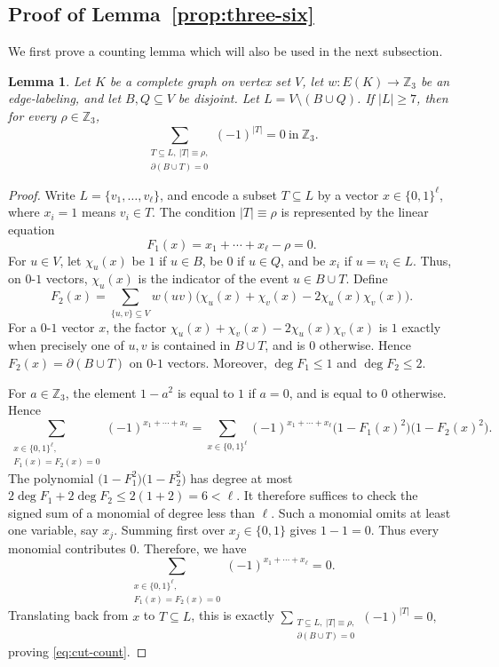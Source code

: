 ﻿\documentclass[11pt]{article}
\numberwithin{equation}{section}
\newtheorem{lemma}[theorem]{Lemma}
\theoremstyle{remark}
\newcommand{\Z}{\mathbb Z}
\begin{document}
\subsection{Proof of Lemma~\ref{prop:three-six}}\label{subsec:prop36}

We first prove a counting lemma which will also be used in the next subsection.

\begin{lemma}\label{lem:cut-count}
    Let $K$ be a complete graph on vertex set $V$, let $w\colon E(K)\to\Z_3$ be an edge-labeling, and let $B,Q\subseteq V$ be disjoint.  Let $L=V\setminus(B\cup Q)$.  If $|L|\ge7$, then for every $\rho\in\Z_3$,
    \begin{equation}\label{eq:cut-count}
        \sum_{\substack{T\subseteq L,\ |T|\equiv\rho,\\ \partial(B\cup T)=0}}(-1)^{|T|}=0\ \text{in}\ \Z_3.
    \end{equation}
\end{lemma}

\begin{proof}
    Write $L=\{v_1,\ldots,v_\ell\}$, and encode a subset $T\subseteq L$ by a vector $x\in\{0,1\}^\ell$, where $x_i=1$ means $v_i\in T$.  The condition $|T|\equiv\rho$ is represented by the linear equation
    \[
        F_1(x)=x_1+\cdots+x_\ell-\rho=0.
    \]
    For \(u\in V\), let $\chi_u(x)$ be $1$ if $u\in B$, be $0$ if $u\in Q$, and be $x_i$ if $u=v_i\in L$.  Thus, on \(0\)-\(1\) vectors, \(\chi_u(x)\) is the indicator of the event \(u\in B\cup T\). Define
    \[
        F_2(x)=\sum_{\{u,v\}\subseteq V}w(uv)\bigl(\chi_u(x)+\chi_v(x)-2\chi_u(x)\chi_v(x)\bigr).
    \]
    For a \(0\)-\(1\) vector \(x\), the factor
    \(\chi_u(x)+\chi_v(x)-2\chi_u(x)\chi_v(x)\)
    is \(1\) exactly when precisely one of \(u,v\) is contained in \(B\cup T\), and is \(0\) otherwise. Hence
    \(F_2(x)=\partial(B\cup T)\)
    on \(0\)-\(1\) vectors. Moreover, \(\deg F_1\le 1\) and \(\deg F_2\le 2\).

    For \(a\in \Z_3\), the element \(1-a^2\) is equal to \(1\) if \(a=0\), and is equal to \(0\) otherwise. Hence
    \[
        \sum_{\substack{x\in\{0,1\}^\ell,\\ F_1(x)=F_2(x)=0}}
        (-1)^{x_1+\cdots+x_\ell}
        =
        \sum_{x\in\{0,1\}^\ell}
        (-1)^{x_1+\cdots+x_\ell}
        \bigl(1-F_1(x)^2\bigr)\bigl(1-F_2(x)^2\bigr).
    \]
    The polynomial
    \(\bigl(1-F_1^2\bigr)\bigl(1-F_2^2\bigr)\)
    has degree at most \(2\deg F_1+2\deg F_2\le 2(1+2)=6<\ell\). It therefore suffices to check the signed sum of a monomial of degree less than \(\ell\). Such a monomial omits at least one variable, say \(x_j\). Summing first over \(x_j\in\{0,1\}\) gives
    \(1-1=0.\)
    Thus every monomial contributes \(0\). Therefore, we have
    \[
        \sum_{\substack{x\in\{0,1\}^\ell,\\ F_1(x)=F_2(x)=0}}
        (-1)^{x_1+\cdots+x_\ell}=0.
    \]
    Translating back from \(x\) to \(T\subseteq L\), this is exactly
    \(
    \sum_{\substack{T\subseteq L,\ |T|\equiv \rho,\\ \partial(B\cup T)=0}}
    (-1)^{|T|}=0,
    \)
    proving \eqref{eq:cut-count}.
\end{proof}
\end{document}
